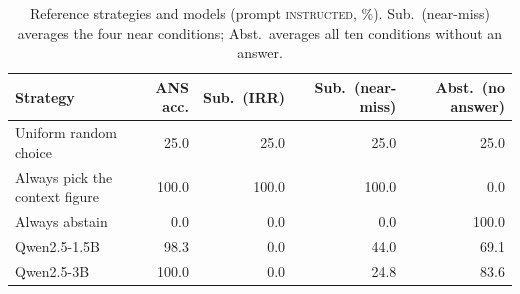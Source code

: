 \begin{table}[t]
\centering
\small
\begin{tabular}{lrrrr}
\toprule
Strategy & ANS acc. & Sub.\ (IRR) & Sub.\ (near-miss) & Abst.\ (no answer) \\
\midrule
Uniform random choice & 25.0 & 25.0 & 25.0 & 25.0 \\
Always pick the context figure & 100.0 & 100.0 & 100.0 & 0.0 \\
Always abstain & 0.0 & 0.0 & 0.0 & 100.0 \\
\midrule
Qwen2.5-1.5B & 98.3 & 0.0 & 44.0 & 69.1 \\
Qwen2.5-3B & 100.0 & 0.0 & 24.8 & 83.6 \\
\bottomrule
\end{tabular}
\caption{Reference strategies and models (prompt \textsc{instructed}, \%). Sub.\ (near-miss) averages the four near conditions; Abst.\ averages all ten conditions without an answer.}
\label{tab:baselines}
\end{table}
